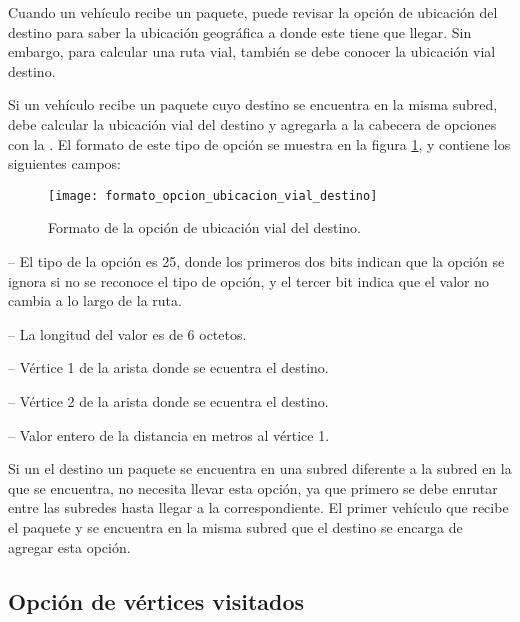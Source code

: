 \label{subsec:opcion_de_ubicacion_vial_del_destino}

Cuando un vehículo recibe un paquete, puede revisar la opción de ubicación del
destino para saber la ubicación geográfica a donde este tiene que llegar. Sin
embargo, para calcular una ruta vial, también se debe conocer la ubicación vial
destino.

Si un vehículo recibe un paquete cuyo destino se encuentra en la misma subred,
debe calcular la ubicación vial del destino y agregarla a la cabecera de
opciones con la . El formato de
este tipo de opción se muestra en la figura
\ref{fig:formato_opcion_ubicacion_vial_destino}, y contiene los siguientes
campos:

\begin{figure}[th!]
\centering
\texttt{[image: formato\_opcion\_ubicacion\_vial\_destino]}
\decoRule
\caption[Formato de la opción de ubicación vial del destino]{Formato de la
opción de ubicación vial del destino.}
\label{fig:formato_opcion_ubicacion_vial_destino}
\end{figure}

 -- El tipo de la opción es 25, donde los primeros dos
bits indican que la opción se ignora si no se reconoce el tipo de opción, y el
tercer bit indica que el valor no cambia a lo largo de la ruta.

 -- La longitud del valor es de 6 octetos.

 -- Vértice 1 de la arista donde se ecuentra el
destino.

 -- Vértice 2 de la arista donde se ecuentra el
destino.

 -- Valor entero de la distancia en metros al
vértice 1.

Si un el destino un paquete se encuentra en una subred diferente a la subred en
la que se encuentra, no necesita llevar esta opción, ya que primero se debe
enrutar entre las subredes hasta llegar a la correspondiente. El primer
vehículo que recibe el paquete y se encuentra en la misma subred que el destino
se encarga de agregar esta opción.

\subsection{Opción de vértices visitados}

